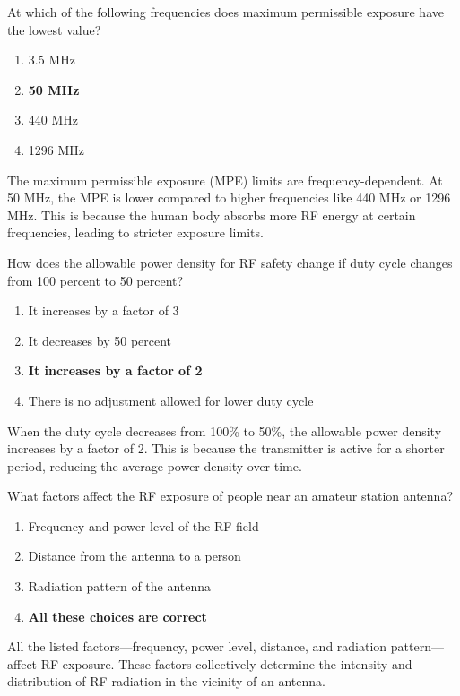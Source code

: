 
\begin{tcolorbox}[colback=gray!10!white,colframe=black!75!black,title={T0C02}]
At which of the following frequencies does maximum permissible exposure have the lowest value?
\begin{enumerate}[label=\Alph*),noitemsep]
    \item 3.5 MHz
    \item \textbf{50 MHz}
    \item 440 MHz
    \item 1296 MHz
\end{enumerate}
\end{tcolorbox}
The maximum permissible exposure (MPE) limits are frequency-dependent. At 50 MHz, the MPE is lower compared to higher frequencies like 440 MHz or 1296 MHz. This is because the human body absorbs more RF energy at certain frequencies, leading to stricter exposure limits.


\begin{tcolorbox}[colback=gray!10!white,colframe=black!75!black,title={T0C03}]
How does the allowable power density for RF safety change if duty cycle changes from 100 percent to 50 percent?
\begin{enumerate}[label=\Alph*),noitemsep]
    \item It increases by a factor of 3
    \item It decreases by 50 percent
    \item \textbf{It increases by a factor of 2}
    \item There is no adjustment allowed for lower duty cycle
\end{enumerate}
\end{tcolorbox}
When the duty cycle decreases from 100\% to 50\%, the allowable power density increases by a factor of 2. This is because the transmitter is active for a shorter period, reducing the average power density over time.


\begin{tcolorbox}[colback=gray!10!white,colframe=black!75!black,title={T0C04}]
What factors affect the RF exposure of people near an amateur station antenna?
\begin{enumerate}[label=\Alph*),noitemsep]
    \item Frequency and power level of the RF field
    \item Distance from the antenna to a person
    \item Radiation pattern of the antenna
    \item \textbf{All these choices are correct}
\end{enumerate}
\end{tcolorbox}
All the listed factors—frequency, power level, distance, and radiation pattern—affect RF exposure. These factors collectively determine the intensity and distribution of RF radiation in the vicinity of an antenna.

